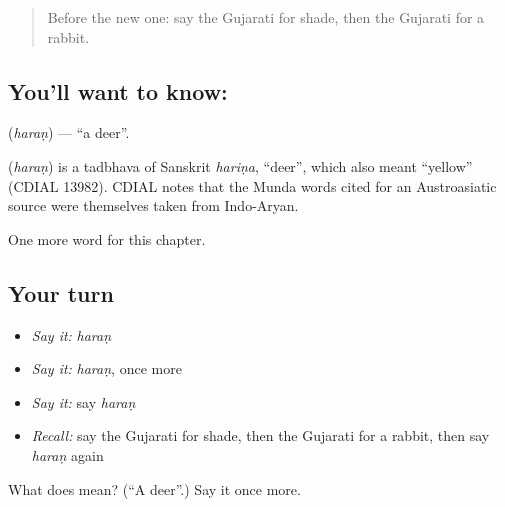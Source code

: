 \label{lesson:GU-C121-haran}



\begin{quote}
Before the new one: say the Gujarati for shade, then the Gujarati for a rabbit.
\end{quote}

\subsection*{You'll want to know: }
\textbf{} (\emph{haraṇ}) — \textquotedblleft{}a deer\textquotedblright{}.

\begin{cousinweb}
\textbf{} (\emph{haraṇ}) is a tadbhava of Sanskrit \emph{hariṇa}, \textquotedblleft{}deer\textquotedblright{}, which also meant \textquotedblleft{}yellow\textquotedblright{} (CDIAL 13982). CDIAL notes that the Munda words cited for an Austroasiatic source were themselves taken from Indo-Aryan.
\end{cousinweb}

\begin{grammarlens}[title={What you've built}]
One more word for this chapter.
\end{grammarlens}

\subsection*{Your turn}
\begin{itemize}
\raggedright
  \item \emph{Say it:} \emph{haraṇ}
  \item \emph{Say it:} \emph{haraṇ}, once more
  \item \emph{Say it:} say \emph{haraṇ}
  \item \emph{Recall:} say the Gujarati for shade, then the Gujarati for a rabbit, then say \emph{haraṇ} again
\end{itemize}

\begin{tcolorbox}[breakable,colback=teal!4,colframe=teal!35!black,title={Before you move on}]
What does  mean? (\textquotedblleft{}A deer\textquotedblright{}.) Say it once more.
\end{tcolorbox}
